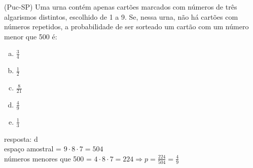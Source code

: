 \begin{ex}
 (Puc-SP) Uma urna contém apenas cartões marcados com números de três algarismos distintos, escolhido de 1 a 9. Se, nessa urna, não há cartões com números repetidos, a probabilidade de ser sorteado um cartão com um número menor que 500 é:
    \begin{enumerate}[(a)]
    \item $\frac{3}{4}$
    \item $\frac{1}{2}$
    \item $\frac{8}{21}$
    \item $\frac{4}{9}$
    \item $\frac{1}{3}$
    \end{enumerate}
      \begin{sol}
        resposta: d \\
        espaço amostral = $9\cdot8\cdot7=504$ \\
        números menores que 500 = $4\cdot8\cdot7=224 \Longrightarrow  p=\frac{224}{504}=\frac{4}{9}$
        
      \end{sol}
\end{ex}